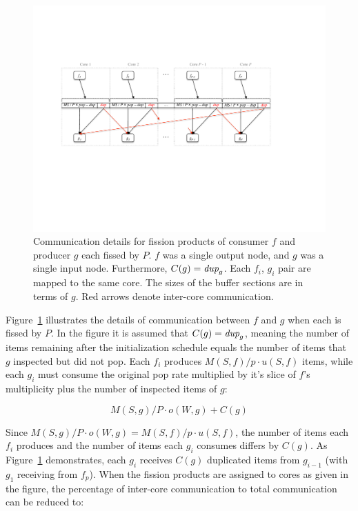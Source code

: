 \begin{figure}[t]
\centering
\includegraphics[width=6in]{figures/core-comm.pdf}
\caption[Communication between cores for fission of producer and
consumer.]{ Communication details for fission products of consumer $f$
  and producer $g$ each fissed by $P$.  $f$ was a single output node,
  and $g$ was a single input node.  Furthermore, $C(g) = \mbox{\it dup}_g$.
  Each $f_i$, $g_i$ pair are mapped to the same core.
  The sizes of the buffer sections are in terms of $g$. Red arrows
  denote inter-core communication. \label{fig:core-comm}}
\end{figure}

Figure~\ref{fig:core-comm} illustrates the details of communication
between $f$ and $g$ when each is fissed by $P$.  In the figure it is
assumed that $C(g) = \mbox{\it dup}_g $, meaning the number of items
remaining after the initialization schedule equals the number of items
that $g$ inspected but did not pop.  Each $f_i$ produces $M(S,f)/p
\cdot u(S,f)$ items, while each $g_i$ must consume the original pop
rate multiplied by it's slice of $f$'s multiplicity plus the number of
inspected items of $g$:

\[ M(S,g)/P \cdot o(W, g) + C(g) \]

\noindent Since $M(S,g)/P \cdot o(W, g) = M(S,f)/p
\cdot u(S,f)$, the number of items each $f_i$ produces and the number
of items each $g_i$ consumes differs by $C(g)$.
As Figure~\ref{fig:core-comm} demonstrates, each $g_i$
receives $C(g)$ duplicated items from $g_{i-1}$ (with $g_1$
receiving from $f_p$).  When the fission products are assigned to
cores as given in the figure, the percentage of inter-core
communication to total communication can be reduced to:

